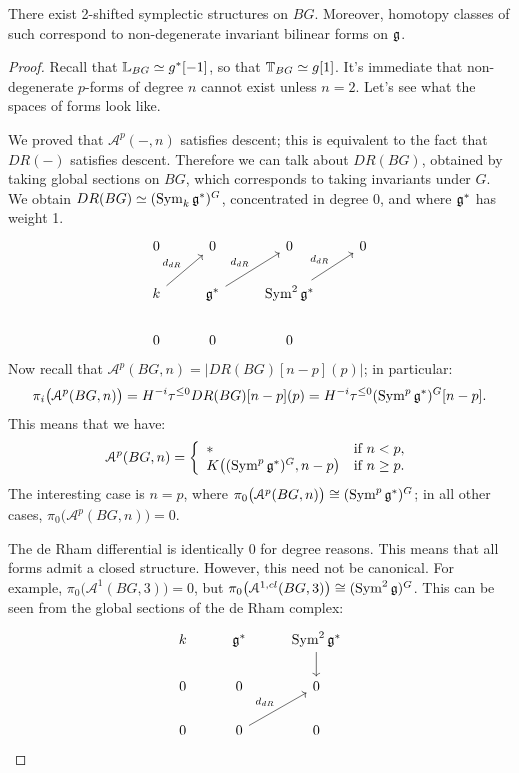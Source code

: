 \begin{prop}
There exist 2-shifted symplectic structures on $BG$. Moreover, homotopy classes of such correspond to non-degenerate 
invariant bilinear forms on $\mathfrak g$.
\end{prop}
\begin{proof}
Recall that $\mathbb L_{BG} \simeq g^* [-1]$, so that $\mathbb T_{BG} \simeq g[1]$. It's immediate that non-degenerate
$p$-forms of degree $n$ cannot exist unless $n=2$. Let's see what the spaces of forms look like.

We proved that $\mathcal{A}^p(-,n)$ satisfies descent; this is equivalent to the fact that $DR(-)$ satisfies descent.
Therefore we can talk about $DR(BG)$, obtained by taking global sections on $BG$, which corresponds to taking
invariants under $G$. We obtain $DR(BG) \simeq (\operatorname{Sym}_k \mathfrak g^*)^G$, concentrated
in degree 0, and where $\mathfrak g^*$ has weight 1.
\[
\begin{tikzcd}
0 & 0 & 0 & 0 \\
k\arrow{ur}{d_{dR}} & \fr g^*\arrow{ur}{d_{dR}} & \Sym^2 \fr g^*\arrow{ur}{d_{dR}} & \\
0 & 0 & 0 & 
\end{tikzcd}
\]
Now recall that $\mathcal{A}^p(BG,n) = |DR(BG)[n-p](p)|$; in particular:
\[	\pi_i\big(\mathcal{A}^p(BG,n)\big) = H^{-i} \tau^{\leq 0} DR(BG)[n-p](p) = H^{-i} \tau^{\leq 0} (\operatorname{Sym}^p \mathfrak g^*)^G [n-p]	.	\] 
This means that we have:
\begin{equation}
\label{eq:desc_forms}
	\mathcal{A}^p(BG,n) = 
\left\{ \begin{array} {ll} * & \text{if } n<p,  \\ 
K\big((\operatorname{Sym}^p \mathfrak g^*)^G, n-p\big) & \text{if } n\geq p .  \end{array} \right.
\end{equation}
The interesting case is $n=p$, where $\pi_0\big(\mathcal{A}^p(BG,n)\big) \cong (\operatorname{Sym}^p \mathfrak g^*)^G$; in all other cases,
$\pi_0\big(\mathcal{A}^p(BG,n)\big) = 0$.

The de Rham differential is identically 0 for degree reasons. This means that all forms admit a closed structure. However, this
need not be canonical. For example, $\pi_0\big(\mathcal{A}^1(BG,3)\big) = 0$, but $\pi_0\big(\mathcal{A}^{1,cl}(BG,3)\big) \cong 
(\operatorname{Sym}^2 \mathfrak g)^G$. This can be seen from the global sections of the de Rham complex:
\[
\begin{tikzcd}
k & \fr g^* & \Sym^2 \fr g^*\arrow{d} \\
0 & 0 & 0 \\
0 & 0\arrow{ur}{d_{dR}} & 0 
\end{tikzcd}
\]


\end{proof}
